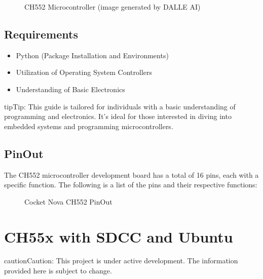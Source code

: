 \documentclass[letterpaper,10pt,english]{sphinxmanual}
\begin{document}
\begin{figure}[htbp]
\centering
\capstart

\noindent{}
\caption{CH552 Microcontroller (image generated by DALLE AI)}\label{\detokenize{about:id2}}\label{\detokenize{about:ch552}}\end{figure}


\section{Requirements}
\label{\detokenize{about:requirements}}\begin{itemize}
\item {} 
\sphinxAtStartPar
Python (Package Installation and Environments)

\item {} 
\sphinxAtStartPar
Utilization of Operating System Controllers

\item {} 
\sphinxAtStartPar
Understanding of Basic Electronics

\end{itemize}

\begin{sphinxadmonition}{tip}{Tip:}
\sphinxAtStartPar
This  guide is tailored for individuals with a basic understanding of programming and electronics. It’s ideal for those interested in diving into embedded systems and programming microcontrollers.
\end{sphinxadmonition}


\section{PinOut}
\label{\detokenize{about:pinout}}
\sphinxAtStartPar
The CH552 microcontroller development board has a total of 16 pins, each with a specific function. The following is a list of the pins and their respective functions:

\begin{figure}[htbp]
\centering
\capstart

\noindent{}
\caption{Cocket Nova CH552 PinOut}\label{\detokenize{about:id3}}\label{\detokenize{about:id1}}\end{figure}

\sphinxstepscope


\chapter{CH55x with SDCC and Ubuntu}
\label{\detokenize{install_linux:ch55x-with-sdcc-and-ubuntu}}\label{\detokenize{install_linux::doc}}
\begin{sphinxadmonition}{caution}{Caution:}
\sphinxAtStartPar
This project is under active development. The information provided here is subject to change.
\end{sphinxadmonition}
\end{document}
